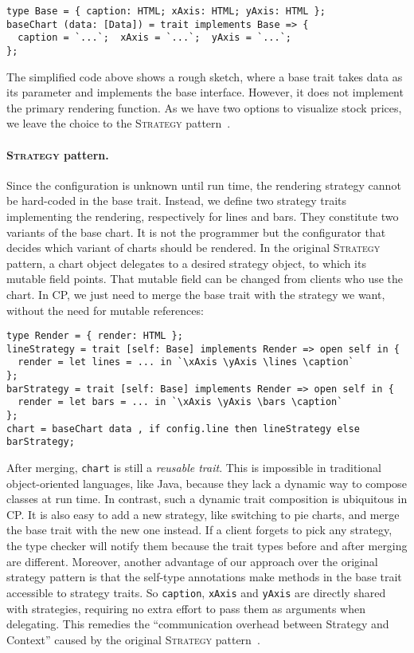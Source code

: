 \begin{lstlisting}
type Base = { caption: HTML; xAxis: HTML; yAxis: HTML };
baseChart (data: [Data]) = trait implements Base => {
  caption = `...`;  xAxis = `...`;  yAxis = `...`;
};
\end{lstlisting}

\noindent
The simplified code above shows a rough sketch, where a base trait takes data as
its parameter and implements the base interface. However, it does not implement
the primary rendering function. As we have two options to visualize stock
prices, we leave the choice to the \textsc{Strategy}
pattern~\citep{gamma1995design}.

\paragraph{\textsc{Strategy} pattern.}
Since the configuration is unknown until run time, the rendering strategy cannot
be hard-coded in the base trait. Instead, we define two strategy traits
implementing the rendering, respectively for lines and bars. They constitute two
variants of the base chart. It is not the programmer but the configurator that
decides which variant of charts should be rendered. In the original
\textsc{Strategy} pattern, a chart object delegates to a desired strategy
object, to which its mutable field points. That mutable field can be changed
from clients who use the chart. In CP, we just need to merge the base trait with
the strategy we want, without the need for mutable references:

\begin{lstlisting}
type Render = { render: HTML };
lineStrategy = trait [self: Base] implements Render => open self in {
  render = let lines = ... in `\xAxis \yAxis \lines \caption`
};
barStrategy = trait [self: Base] implements Render => open self in {
  render = let bars = ... in `\xAxis \yAxis \bars \caption`
};
chart = baseChart data , if config.line then lineStrategy else barStrategy;
\end{lstlisting}

\noindent
After merging, \lstinline{chart} is still a \emph{reusable trait}. This is
impossible in traditional object-oriented languages, like Java, because they
lack a dynamic way to compose classes at run time. In contrast, such a dynamic
trait composition is ubiquitous in CP. It is also easy to add a new strategy,
like switching to pie charts, and merge the base trait with the new one instead.
If a client forgets to pick any strategy, the type checker will notify them
because the trait types before and after merging are different. Moreover,
another advantage of our approach over the original strategy pattern is that the
self-type annotations make methods in the base trait accessible to strategy
traits. So \lstinline{caption}, \lstinline{xAxis} and \lstinline{yAxis} are
directly shared with strategies, requiring no extra effort to pass them as
arguments when delegating. This remedies the ``communication overhead between
Strategy and Context'' caused by the original \textsc{Strategy}
pattern~\citep{gamma1995design}.

